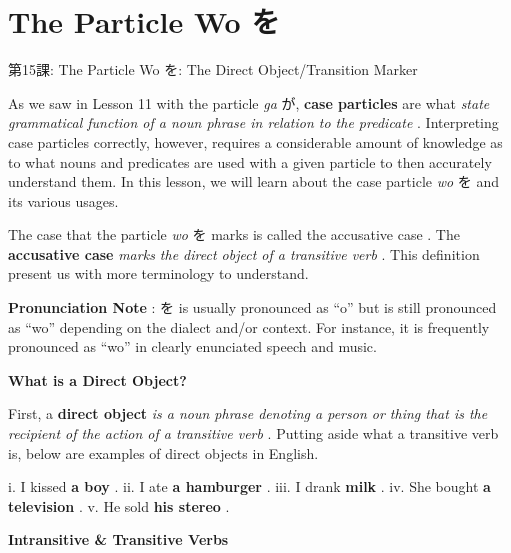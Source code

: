    
\chapter{The Particle Wo を}

\begin{center}
\begin{Large}
第15課: The Particle Wo を: The Direct Object\slash Transition Marker 
\end{Large}
\end{center}
 
\par{ As we saw in Lesson 11 with the particle \emph{ga }が, \textbf{case particles }are what \emph{state grammatical function of a noun phrase in relation to the predicate }. Interpreting case particles correctly, however, requires a considerable amount of knowledge as to what nouns and predicates are used with a given particle to then accurately understand them. In this lesson, we will learn about the case particle \emph{wo }を and its various usages. }

\par{ The case that the particle \emph{wo }を marks is called the accusative case . The \textbf{accusative case } \emph{marks the direct object of a transitive verb }. This definition present us with more terminology to understand. }

\par{\textbf{Pronunciation Note }: を is usually pronounced as “o” but is still pronounced as “wo” depending on the dialect and\slash or context. For instance, it is frequently pronounced as “wo” in clearly enunciated speech and music. }

\begin{center}
\textbf{What is a Direct Object? }
\end{center}

\par{ First, a \textbf{direct object } \emph{is a noun phrase denoting a person or thing that is the recipient of the action of a transitive verb }. Putting aside what a transitive verb is, below are examples of direct objects in English. }

\par{i. I kissed \textbf{a boy }. \hfill\break
ii. I ate \textbf{a hamburger }. \hfill\break
iii. I drank \textbf{milk }. \hfill\break
iv. She bought \textbf{a television }. \hfill\break
v. He sold \textbf{his stereo }. }

\begin{center}
 \textbf{Intransitive \& Transitive Verbs }
\end{center}

